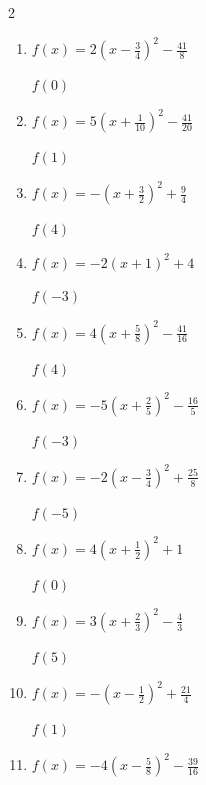 \begin{multicols}{2}
\begin{enumerate}
\columnbreak %

\resetques

  \item $\displaystyle f(x)=2\left( x-\frac{3}{4}\right)^{2}-\frac{41}{8}$

$f(0)$
        \phantom{$=-4$}

  \item $\displaystyle f(x)=5\left( x+\frac{1}{10}\right)^{2}-\frac{41}{20}$

$f(1)$
        \phantom{$=4$}

  \item $\displaystyle f(x)=-\left( x+\frac{3}{2}\right)^{2}+\frac{9}{4}$

$f(4)$
        \phantom{$=-28$}

  \item $\displaystyle f(x)=-2\left( x+1\right)^{2}+4$

$f(-3)$
        \phantom{$=-4$}

  \item $\displaystyle f(x)=4\left( x+\frac{5}{8}\right)^{2}-\frac{41}{16}$

$f(4)$
        \phantom{$=83$}

\columnbreak %

  \item $\displaystyle f(x)=-5\left( x+\frac{2}{5}\right)^{2}-\frac{16}{5}$

$f(-3)$
        \phantom{$=-37$}

  \item $\displaystyle f(x)=-2\left( x-\frac{3}{4}\right)^{2}+\frac{25}{8}$

$f(-5)$
        \phantom{$=-63$}

  \item $\displaystyle f(x)=4\left( x+\frac{1}{2}\right)^{2}+1$

$f(0)$
        \phantom{$=2$}

  \item $\displaystyle f(x)=3\left( x+\frac{2}{3}\right)^{2}-\frac{4}{3}$

$f(5)$
        \phantom{$=95$}

  \item $\displaystyle f(x)=-\left( x-\frac{1}{2}\right)^{2}+\frac{21}{4}$

$f(1)$
        \phantom{$=5$}

\columnbreak %

\resetques

  \item $\displaystyle f(x)=-4\left( x-\frac{5}{8}\right)^{2}-\frac{39}{16}$


\end{enumerate}
\end{multicols}

